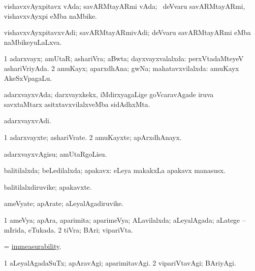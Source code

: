 \bentry
{}
\gl{\nA}
\bmng
vishavxvAyxpitavx vAda; savARMtayARmi vAda; \kanmu\ deVvaru savARMtayARmi, vishavxvAyxpi eMba naMbike. 
\emng
\eentry

\bentry
{}
\gl{\nA}
\bmng
vishavxvAyxpitavxvAdi; savARMtayARmivAdi; deVvaru savARMtayARmi eMba naMbikeyuLaLxva. 
\emng
\eentry

\bentry
{}
\gl{\gu}
\bmng
\bnum
\num{1} adarxvayx; amUtaR; ashariVra; aBwta; dayxvayxvalalxda:  perxVtadaMteyeV ashariVriyAda. 
\num{2} amuKayx; aparxdhAna; gwNa; mahatavxvilalxda:  amuKayx AkeSxVpagaLu. 
\enum
\emng
\eentry

\bentry
{}
\gl{\nA}
\bmng
adarxvayxvAda; darxvayxkekx, iMdirxyagaLige goVcaravAgade iruva savxtaMtarx asitxtavxvilalxveMba sidAdhxMta. 
\emng
\eentry

\bentry
{}
\gl{\nA}
\bmng
adarxvayxvAdi. 
\emng
\eentry

\bentry
{}
\gl{\nA}
\bmng
\bnum
\num{1} adarxvayxte; ashariVrate. 
\num{2} amuKayxte; apArxdhAnayx. 
\enum
\emng
\eentry

\bentry
{}
\gl{\sakirx}
\bmng
adarxvayxvAgisu; amUtaRgoLisu. 
\emng
\eentry

\bentry
{}
\gl{\gu}
\bmng
balitilalxda; beLedilalxda; apakavx:  eLeya makakxLa apakavx manasusx. 
\emng
\eentry

\bentry
{}
\gl{\nA}
\bmng
balitilalxdiruvike; apakavxte. 
\emng
\eentry

\bentry
{}
\gl{\nA}
\bmng
ameVyate; apArate; aLeyalAgadiruvike. 
\emng
\eentry

\bentry
{}
\gl{\gu}
\bmng
\bnum
\num{1} ameVya; apAra, aparimita; aparimeVya; ALavilalxda; aLeyalAgada; aLatege -- mIrida, eTukada. 
\num{2} tiVra; BAri; vipariVta. 
\enum
\emng
\eentry

\bentry
{}
\gl{\nA}
\bmng
 = \hyperlink{immeasurability}{immeasurability}. 
\emng
\eentry

\bentry
{}
\gl{\kirxvi}
\bmng
\bnum
\num{1} aLeyalAgadaSuTx; apAravAgi; aparimitavAgi. 
\num{2} vipariVtavAgi; BAriyAgi. 
\enum
\emng
\eentry

